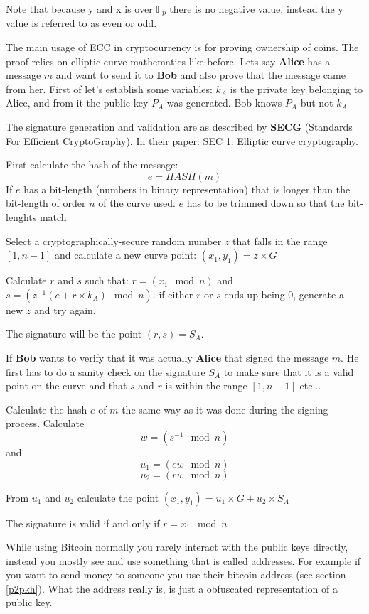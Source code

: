 Note that because y and x is over $\mathbb{F}_{p}$ there is no negative value, instead the y 
value is referred to as even or odd. 




The main usage of ECC in cryptocurrency is for proving ownership of coins.\cite{antonopoulos_2017}\cite{nakamoto_bitcoin} The proof relies 
on elliptic curve mathematics like before. Lets say \textbf{Alice} has a message $m$ and want 
to send it to \textbf{Bob} and also prove that the message came from her. First of let's 
establish some variables: $k_A$ is the private key belonging to Alice, and from it the public key $P_A$ was generated. Bob knows $P_A$ but not $k_A$ 

The signature generation and validation are as described by \textbf{SECG} (Standards For Efficient CryptoGraphy). In their paper: SEC 1: Elliptic curve cryptography.\cite{ecc_def}

First calculate the hash of the message:
$$e=HASH(m)$$
If $e$ has a bit-length (numbers in binary representation) that is longer than the bit-length 
of order $n$ of the curve used. $e$ has to be trimmed down so that the bit-lenghts match

Select a cryptographically-secure random number $z$ that falls in the range $[1, n-1]$ and 
calculate a new curve point: $(x_1, y_1) = z \times G$

Calculate $r$ and $s$ such that: $r = (x_1 \mod n)$ and $s = (z^{-1} (e + r \times k_A) \mod n)$. 
if either $r$ or $s$ ends up being 0, generate a new $z$ and try again.

The signature will be the point $(r, s) = S_A$.

\label{signature_validation}
If \textbf{Bob} wants to verify that it was actually \textbf{Alice} that signed the message $m$. 
He first has to do a sanity check on the signature $S_A$ to make sure that it is a valid point on 
the curve and that $s$ and $r$ is within the range $[1, n-1]$ etc... 

Calculate the hash $e$ of $m$ the same way as it was done during the signing process. Calculate 
$$w=(s^{-1} \mod n)$$ and $$u_1 = (ew \mod n)$$ $$u_2 = (rw \mod n)$$

From $u_1$ and $u_2$ calculate the point $(x_1, y_1) = u_1 \times G + u_2 \times S_A$ 

The signature is valid if and only if $r = x_1 \mod n$

While using Bitcoin normally you rarely interact with the public keys directly, instead you mostly see  and use something that is called addresses.\cite{antonopoulos_2017} For example if you want to send money to someone you use their bitcoin-address (see section \ref{p2pkh}). What the address really is, is just a obfuscated representation of a public key.  

